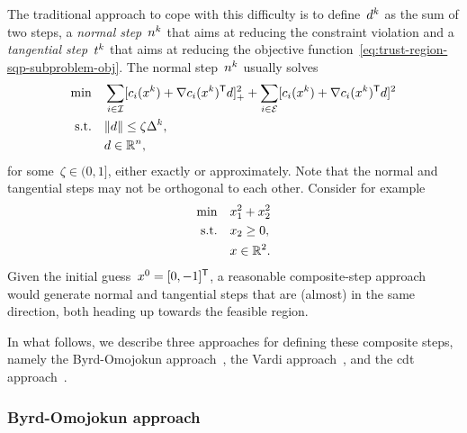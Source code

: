The traditional approach to cope with this difficulty is to define~$\step[k]$ as the sum of two steps, a \emph{normal step}~$\nstep[k]$ that aims at reducing the constraint violation and a \emph{tangential step}~$\tstep[k]$ that aims at reducing the objective function~\cref{eq:trust-region-sqp-subproblem-obj}.
The normal step~$\nstep[k]$ usually solves
\begin{subequations}
    \label{eq:byrd-omojokun}
    \begin{align}
        \min        & \quad \sum_{i \in \iub} \posp{\con{i}(\iter[k]) + \nabla \con{i}(\iter[k])^{\T} \step}^2 + \sum_{i \in \ieq} [\con{i}(\iter[k]) + \nabla \con{i}(\iter[k])^{\T} \step]^2 \label{eq:byrd-omojokun-obj}\\
        \text{s.t.} & \quad \norm{\step} \le \zeta \rad[k],\\
                    & \quad \step \in \R^n, \nonumber
    \end{align}
\end{subequations}
for some~$\zeta \in (0, 1]$, either exactly or approximately.
Note that the normal and tangential steps may not be orthogonal to each other.
Consider for example
\begin{align*}
    \min        & \quad \iter_1^2 + \iter_2^2\\
    \text{s.t.} & \quad \iter_2 \ge 0,\\
                & \quad \iter \in \R^2.
\end{align*}
Given the initial guess~$\iter[0] = [0, -1]^{\T}$, a reasonable composite-step approach would generate normal and tangential steps that are (almost) in the same direction, both heading up towards the feasible region.

In what follows, we describe three approaches for defining these composite steps, namely the Byrd-Omojokun approach~\cite{Byrd_1987,Omojokun_1989}, the Vardi approach~\cite{Vardi_1985}, and the \gls{cdt} approach~\cite{Celis_Dennis_Tapia_1985}.

\subsubsection{Byrd-Omojokun approach}

